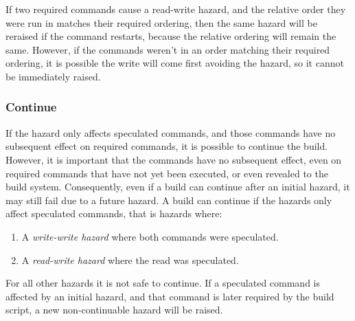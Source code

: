 If two required commands cause a read-write hazard, and the relative order they were run in matches their required ordering, then the same hazard will be reraised if the command restarts, because the relative ordering will remain the same. However, if the commands weren't in an order matching their required ordering, it is possible the write will come first avoiding the hazard, so it cannot be immediately raised.

\subsubsection{Continue}
\label{sec:proof:continue}

If the hazard only affects speculated commands, and those commands have no subsequent effect on required commands, it is possible to continue the build. However, it is important that the commands have no subsequent effect, even on required commands that have not yet been executed, or even revealed to the build system. Consequently, even if a build can continue after an initial hazard, it may still fail due to a future hazard. A build can continue if the hazards only affect speculated commands, that is hazards where:

\begin{enumerate}
\item A \emph{write-write hazard} where both commands were speculated.
\item A \emph{read-write hazard} where the read was speculated.
\end{enumerate}

For all other hazards it is not safe to continue. If a speculated command is affected by an initial hazard, and that command is later required by the build script, a new non-continuable hazard will be raised.





